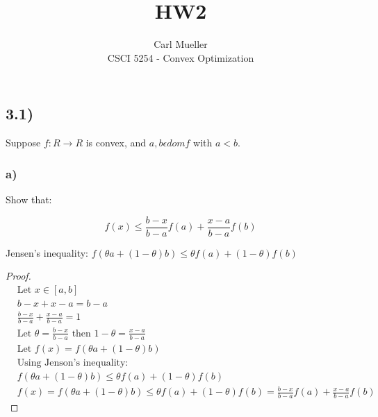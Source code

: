 \documentclass[12pt]{article}
\newenvironment{proposition}[2][Proposition]{\begin{trivlist}
\item[\hskip \labelsep {\bfseries #1}\hskip \labelsep {\bfseries #2.}]}{\end{trivlist}}
\begin{document}
 
 
 
\title{HW2}%
\author{Carl Mueller\\ %
CSCI 5254 - Convex Optimization} %
 
\maketitle

\subsection*{3.1)}
\begin{proposition}{}
Suppose $f: R \rightarrow R$ is convex, and $a, b \epsilon dom f$ with $a < b$.
\end{proposition}
\subsubsection*{a)}
Show that:

$$
f(x) \le \frac{b-x}{b-a}f(a) + \frac{x-a}{b-a}f(b)
$$

\begin{proposition}{1}
Jensen's inequality: $f(\theta a + (1 - \theta)b) \le \theta f(a) + (1 - \theta) f(b)$
\end{proposition}
\begin{proof}
\begin{align*}
& \text{Let } x \in [a,b]\\
& b-x + x-a = b-a\\
& \frac{b-x}{b-a} + \frac{x-a}{b-a} = 1\\
& \text{Let } \theta = \frac{b-x}{b-a} \text{ then } 1 - \theta = \frac{x-a}{b-a}\\
& \text{Let } f(x) = f(\theta a + (1 - \theta)b)\\
& \text{Using Jenson's inequality:}\\
& f(\theta a + (1 - \theta)b) \le \theta f(a) + (1 - \theta) f(b)\\
& f(x) = f(\theta a + (1 - \theta)b) \le \theta f(a) + (1 - \theta) f(b) = \frac{b-x}{b-a}f(a) + \frac{x-a}{b-a}f(b)
\end{align*}
\end{proof}
\end{document}
